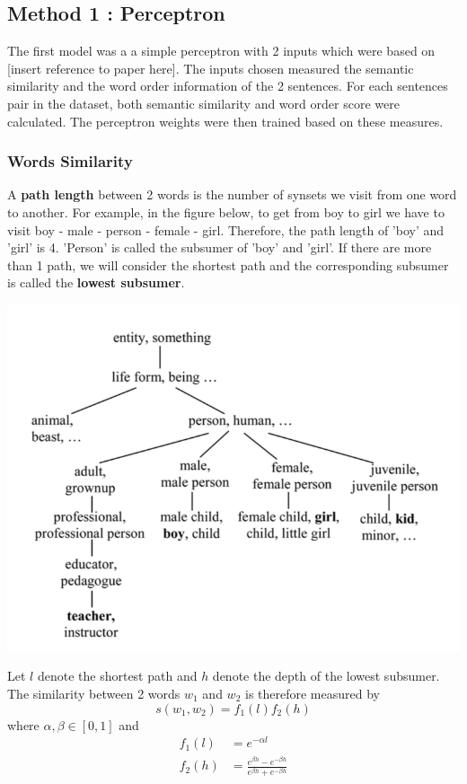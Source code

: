 \subsection{Method 1 : Perceptron}

The first model was a a simple perceptron with 2 inputs which were based on [insert reference to paper here]. The inputs chosen measured the semantic similarity and the word order information of the 2 sentences. For each sentences pair in the dataset, both semantic similarity and word order score were calculated. The perceptron weights were then trained based on these measures.

\subsubsection{Words Similarity}
A \textbf{path length} between 2 words is the number of synsets we visit from one word to another. For example, in the figure below, to get from boy to girl we have to visit boy - male - person - female - girl. Therefore, the path length of 'boy' and 'girl' is 4. 'Person' is called the subsumer of 'boy' and 'girl'. If there are more than 1 path, we will consider the shortest path and the corresponding subsumer is called the \textbf{lowest subsumer}.

\begin{center}
\includegraphics[scale=0.7]{Synset_tree}
\end{center}

Let $l$ denote the shortest path and $h$ denote the depth of the lowest subsumer. The similarity between 2 words $w_1$ and $w_2$ is therefore measured by 
\begin{equation*}
s(w_1, w_2) = f_1(l) f_2(h)
\end{equation*}
where $\alpha, \beta \in [0,1]$ and 
\begin{align*}
	f_1(l)		&= e^{-\alpha l} \\
	f_2(h)	&= \frac{e^{\beta h} - e^{-\beta h}}{e^{\beta h} + e^{-\beta h}} \\
\end{align*}

